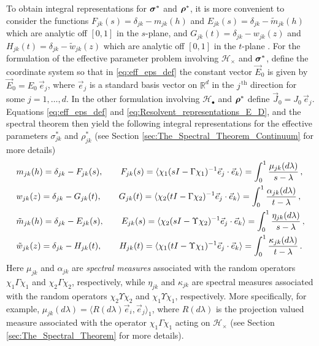 \documentclass{cmslatex}
\newcommand\bsig{\mbox{\boldmath${\sigma}$}}
\newcommand\brho{\mbox{\boldmath${\rho}$}}
\begin{document}
To obtain integral representations for $\bsig^*$ and
$\brho^*$, it is more convenient to consider the functions 
$F_{jk}(s)=\delta_{jk}-m_{jk}(h)$ and $E_{jk}(s)=\delta_{jk}-\tilde{m}_{jk}(h)$
which are analytic off $[0,1]$ in the $s$-plane, and
$G_{jk}(t)=\delta_{jk}-w_{jk}(z)$ and $H_{jk}(t)=\delta_{jk}-\tilde{w}_{jk}(z)$
which are analytic off $[0,1]$ in the $t$-plane
\cite{Golden:CMP-473}. For the formulation of the effective parameter
problem involving $\mathscr{H}_\times$ and $\bsig^*$, define the
coordinate system so that in \eqref{eq:eff_eps_def} the constant
vector $\vec{E}_0$ is given by $\vec{E}_0=E_0\,\vec{e}_j$, where
$\vec{e}_j$ is a standard basis vector on $\mathbb{R}^d$ in the
$j^{\,\text{th}}$ direction for some $j=1,\ldots,d$. In the other
formulation involving $\mathscr{H}_\bullet$ and $\brho^*$ define
$\vec{J}_0=J_0\,\vec{e}_j$. Equations \eqref{eq:eff_eps_def} and 
\eqref{eq:Resolvent_representations_E_D}, and the spectral theorem
\cite{Reed-1980,Stone:64} then yield the following integral
representations
\cite{Golden:CMP-473,Bergman:PRC-377,Bergman:AP-78,Murphy:JMP:063506}  
for the effective parameters $\sigma^*_{jk}$ and $\rho^*_{jk}$ (see Section
\ref{sec:The_Spectral_Theorem_Continuum} for more details)
%
\begin{align}\label{eq:Stieltjes_F}
  &m_{jk}(h)=\delta_{jk}-F_{jk}(s), \qquad
  F_{jk}(s)=\langle\chi_1(sI-\Gamma\chi_1)^{-1}\vec{e}_j\cdot\vec{e}_k\rangle=\int_0^1\frac{\mu_{jk}(d\lambda)}{s-\lambda}\,,
  \\
  &w_{jk}(z)=\delta_{jk}-G_{jk}(t), \qquad
  G_{jk}(t)=\langle\chi_2(tI-\Gamma\chi_2)^{-1}\vec{e}_j\cdot\vec{e}_k\rangle=\int_0^1\frac{\alpha_{jk}(d\lambda)}{t-\lambda}\,,
  \notag \\
  &\tilde{m}_{jk}(h)=\delta_{jk}-E_{jk}(s), \qquad
  E_{jk}(s)=\langle\chi_2(sI-\Upsilon\chi_2)^{-1}\vec{e}_j\cdot\vec{e}_k\rangle=\int_0^1\frac{\eta_{jk}(d\lambda)}{s-\lambda}\,,
  \notag \\
  &\tilde{w}_{jk}(z)=\delta_{jk}-H_{jk}(t), \qquad
  H_{jk}(t)=\langle\chi_1(tI-\Upsilon\chi_1)^{-1}\vec{e}_j\cdot\vec{e}_k\rangle=\int_0^1\frac{\kappa_{jk}(d\lambda)}{t-\lambda}\,.
  \notag
\end{align}
%
Here $\mu_{jk}$ and $\alpha_{jk}$ are \emph{spectral measures} associated
with the random operators $\chi_1\Gamma\chi_1$ and $\chi_2\Gamma\chi_2$, respectively, while
$\eta_{jk}$ and $\kappa_{jk}$ are spectral measures associated
with the random operators $\chi_2\Upsilon\chi_2$ and $\chi_1\Upsilon\chi_1$, respectively. More
specifically, for example, $\mu_{jk}(d\lambda)=\langle R(d\lambda)\vec{e}_i,\vec{e}_j\rangle_1$,
where $R(d\lambda)$ is the projection valued measure associated with the
operator $\chi_1\Gamma\chi_1$ acting on $\mathscr{H}_\times$ (see Section
\ref{sec:The_Spectral_Theorem} for more details).   
\end{document}
